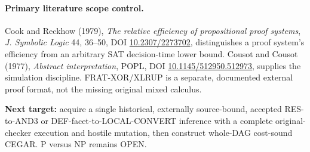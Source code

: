 \documentclass[11pt]{article}
\begin{document}
\paragraph{Primary literature scope control.}
Cook and Reckhow (1979), \emph{The relative efficiency of propositional proof systems}, \emph{J. Symbolic Logic} 44, 36--50, DOI \href{https://doi.org/10.2307/2273702}{10.2307/2273702}, distinguishes a proof system's efficiency from an arbitrary SAT decision-time lower bound. Cousot and Cousot (1977), \emph{Abstract interpretation}, POPL, DOI \href{https://doi.org/10.1145/512950.512973}{10.1145/512950.512973}, supplies the simulation discipline. FRAT-XOR/XLRUP is a separate, documented external proof format, not the missing original mixed calculus.

\vspace{1em}
\noindent\textbf{Next target:} acquire a single historical, externally source-bound, accepted RES-to-AND3 or DEF-facet-to-LOCAL-CONVERT inference with a complete original-checker execution and hostile mutation, then construct whole-DAG cost-sound CEGAR. P versus NP remains OPEN.
\end{document}
